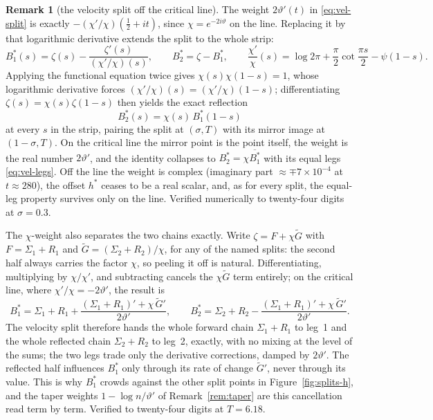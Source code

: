 \documentclass[11pt]{article}
\theoremstyle{definition}
\newtheorem{remark}[theorem]{Remark}
\begin{document}
\begin{remark}[the velocity split off the critical line]\label{rem:vel-offline}
The weight $2\vartheta'(t)$ in \eqref{eq:vel-split} is exactly
$-(\chi'/\chi)(\tfrac12+it)$, since $\chi=e^{-2i\vartheta}$ on the line.
Replacing it by that logarithmic derivative extends the split to the whole
strip:
\begin{equation}\label{eq:vel-split-offline}
B_1^{\ast}(s)=\zeta(s)-\frac{\zeta'(s)}{(\chi'/\chi)(s)},
\qquad
B_2^{\ast}=\zeta-B_1^{\ast},
\qquad
\frac{\chi'}{\chi}(s)=\log 2\pi+\frac{\pi}{2}\cot\frac{\pi s}{2}-\psi(1-s).
\end{equation}
Applying the functional equation twice gives $\chi(s)\chi(1-s)=1$, whose
logarithmic derivative forces $(\chi'/\chi)(s)=(\chi'/\chi)(1-s)$;
differentiating $\zeta(s)=\chi(s)\zeta(1-s)$ then yields the exact reflection
\[
B_2^{\ast}(s)=\chi(s)\,B_1^{\ast}(1-s)
\]
at every $s$ in the strip, pairing the split at $(\sigma,T)$ with its mirror
image at $(1-\sigma,T)$. On the critical line the mirror point is the point
itself, the weight is the real number $2\vartheta'$, and the identity
collapses to $B_2^{\ast}=\chi\overline{B_1^{\ast}}$ with its equal legs
\eqref{eq:vel-legs}. Off the line the weight is complex (imaginary part
$\approx\mp7\times10^{-4}$ at $t\approx280$), the offset $h^{\ast}$ ceases to
be a real scalar, and, as for every split, the equal-leg property survives
only on the line. Verified numerically to twenty-four digits at $\sigma=0.3$.

The $\chi$-weight also separates the two chains exactly. Write
$\zeta=F+\chi\widetilde G$ with $F=\Sigma_1+R_1$ and
$\widetilde G=(\Sigma_2+R_2)/\chi$, for any of the named splits: the second
half always carries the factor $\chi$, so peeling it off is natural.
Differentiating, multiplying by $\chi/\chi'$, and subtracting cancels the
$\chi\widetilde G$ term entirely; on the critical line, where
$\chi'/\chi=-2\vartheta'$, the result is
\begin{equation}\label{eq:vel-split-halves}
B_1^{\ast}
=\Sigma_1+R_1+\frac{(\Sigma_1+R_1)'+\chi\,\widetilde G'}{2\vartheta'},
\qquad
B_2^{\ast}
=\Sigma_2+R_2-\frac{(\Sigma_1+R_1)'+\chi\,\widetilde G'}{2\vartheta'}.
\end{equation}
The velocity split therefore hands the whole forward chain $\Sigma_1+R_1$ to
leg~1 and the whole reflected chain $\Sigma_2+R_2$ to leg~2, exactly, with no
mixing at the level of the sums; the two legs trade only the derivative
corrections, damped by $2\vartheta'$. The reflected
half influences $B_1^{\ast}$ only through its rate of change
$\widetilde G'$, never through its value. This is why $B_1^{\ast}$ crowds
against the other split points in Figure~\ref{fig:splits-h}, and the taper
weights $1-\log n/\vartheta'$ of Remark~\ref{rem:taper} are this cancellation
read term by term. Verified to twenty-four digits at $T=6.18$.
\end{remark}
\end{document}
